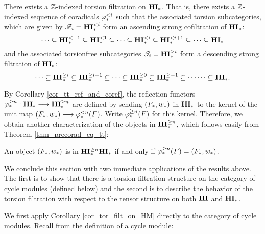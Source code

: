 \begin{cor}\label{cor_tor_filt_on_HM}
There exists a $\mathbb{Z}$-indexed torsion filtration on $\mathbf{HI}_*$. That 
is, there exists a $\mathbb{Z}$-indexed sequence of coradicals $\varphi^{< i}_{*}$
such that the associated torsion subcategories, which are given
by $\mathscr{F}_i = \mathbf{HI}_*^{< i}$
form an ascending strong cofiltration of $\mathbf{HI}_*$:
\[
\cdots \subseteq \mathbf{HI}_*^{< -1} \subseteq \mathbf{HI}_*^{< 1} \subseteq \cdots 
   \subseteq \mathbf{HI}_*^{< i} \subseteq \mathbf{HI}_*^{< i + 1} \subseteq \cdots 
   \subseteq \mathbf{HI}_*
\]
and the associated torsionfree subcategories $\mathscr{T}_i = \mathbf{HI}_*^{\geq i}$
form a descending strong filtration of $\mathbf{HI}_*$:
\[
\cdots \subseteq \mathbf{HI}_*^{\geq i} \subseteq \mathbf{HI}_*^{\geq i - 1} \subseteq 
   \cdots \subseteq \mathbf{HI}_*^{\geq 0} \subseteq \mathbf{HI}_*^{\geq -1} \subseteq \cdots
   \cdots \subseteq \mathbf{HI}_*.
\]
\end{cor}

By Corollary \ref{cor_tt_ref_and_coref}, the reflection functors 
$\varphi^{\geq n}_{*} : \mathbf{HI}_* \longrightarrow \mathbf{HI}_*^{\geq n}$ are defined by sending $(F_*, 
w_*)$ in $\mathbf{HI}_*$ to the kernel of the unit map 
$(F_*, w_*) \longrightarrow \varphi^{< n}_{*}(F)$. Write $\varphi^{\geq n}_{*}(F)$ for this 
kernel. Therefore, we obtain another characterization of the objects 
in $\mathbf{HI}_*^{\geq n}$, which follows easily from Theorem
\ref{thm_precorad_eq_tt}:

\begin{cor}\label{cor_tgHM_prop}
An object $(F_*, w_*)$ is in $\mathbf{HI}_*^{\geq n}\mathbf{HI}_*$ if and only
if $\varphi^{\geq n}_{*}(F) = (F_*, w_*)$.
\end{cor}

We conclude this section with two immediate applications of the
results above. The first is to show that there is a torsion 
filtration structure on the category of cycle modules (defined 
below) and the second is to describe the behavior of the torsion
filtration with respect to the tensor structure on both $\mathbf{HI}$
and $\mathbf{HI}_*$.

We first apply Corollary \ref{cor_tor_filt_on_HM} directly to the
category of cycle modules. Recall from \cite{Rost96} the 
definition of a cycle module:

